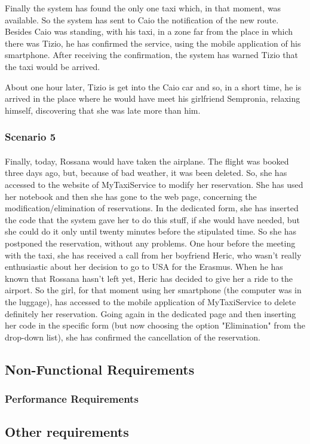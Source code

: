 		\indent Finally the system has found the only one taxi which, in that moment, was available. So the system has sent to Caio the notification of the new route. Besides Caio was standing, with his taxi, in a zone far from the place in which there was Tizio, he has confirmed the service, using the mobile application of his smartphone. After receiving the confirmation, the system has warned Tizio that the taxi would be arrived.
		
		\indent About one hour later, Tizio is get into the Caio car and so, in a short time, he is arrived in the place where he would have meet his girlfriend Sempronia, relaxing himself, discovering that she was late more than him.

		\subsubsection{Scenario 5}
		\paragraph*{}Finally, today, Rossana would have taken the airplane. The flight was booked three days ago, but, because of bad weather, it was been deleted. So, she has accessed to the website of MyTaxiService to modify her reservation. She has used her notebook and then she has gone to the web page, concerning the modification/elimination of reservations. In the dedicated form, she has inserted the code that the system gave her to do this stuff, if she would have needed, but she could do it only until twenty minutes before the stipulated time. So she has postponed the reservation, without any problems.
		\indent One hour before the meeting with the taxi, she has received a call from her boyfriend Heric, who wasn't really enthusiastic about her decision to go to USA for the Erasmus. When he has known that Rossana hasn't left yet, Heric has decided to give her a ride to the airport. So the girl, for that moment using her smartphone (the computer was in the luggage), has accessed to the mobile application of MyTaxiService to delete definitely her reservation. Going again in the dedicated page and then inserting her code in the specific form (but now choosing the option "Elimination" from the drop-down list), she has confirmed the cancellation of the reservation. 
		
	\subsection{Non-Functional Requirements}
		\subsubsection{Performance Requirements}
	\subsection{Other requirements}
	